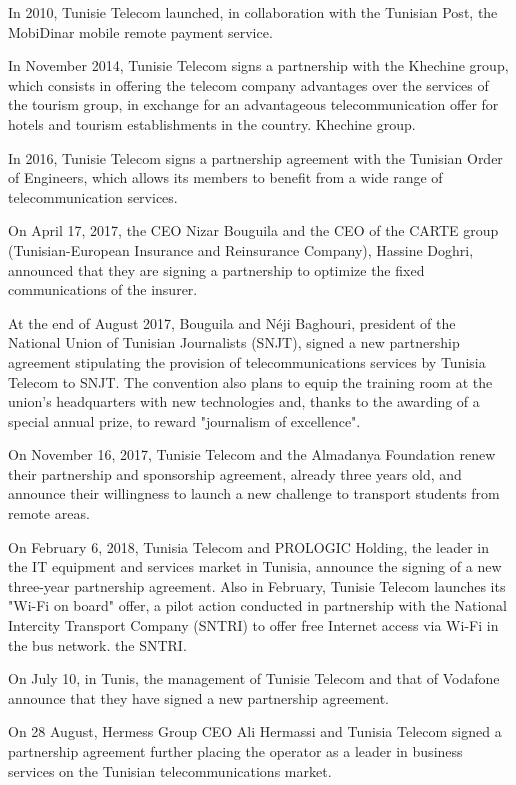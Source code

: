 In 2010, Tunisie Telecom launched, in collaboration with the Tunisian Post, the MobiDinar mobile remote payment service.

In November 2014, Tunisie Telecom signs a partnership with the Khechine group, which consists in offering the telecom company advantages over the services of the tourism group, in exchange for an advantageous telecommunication offer for hotels and tourism establishments in the country. Khechine group.

In 2016, Tunisie Telecom signs a partnership agreement with the Tunisian Order of Engineers, which allows its members to benefit from a wide range of telecommunication services.

On April 17, 2017, the CEO Nizar Bouguila and the CEO of the CARTE group (Tunisian-European Insurance and Reinsurance Company), Hassine Doghri, announced that they are signing a partnership to optimize the fixed communications of the insurer.

At the end of August 2017, Bouguila and Néji Baghouri, president of the National Union of Tunisian Journalists (SNJT), signed a new partnership agreement stipulating the provision of telecommunications services by Tunisia Telecom to SNJT. 
The convention also plans to equip the training room at the union's headquarters with new technologies and, thanks to the awarding of a special annual prize, to reward "journalism of excellence".

On November 16, 2017, Tunisie Telecom and the Almadanya Foundation renew their partnership and sponsorship agreement, already three years old, and announce their willingness to launch a new challenge to transport students from remote areas.

On February 6, 2018, Tunisia Telecom and PROLOGIC Holding, the leader in the IT equipment and services market in Tunisia, announce the signing of a new three-year partnership agreement. Also in February, Tunisie Telecom launches its "Wi-Fi on board" offer, a pilot action conducted in partnership with the National Intercity Transport Company (SNTRI) to offer free Internet access via Wi-Fi in the bus network. the SNTRI.

On July 10, in Tunis, the management of Tunisie Telecom and that of Vodafone announce that they have signed a new partnership agreement.

On 28 August, Hermess Group CEO Ali Hermassi and Tunisia Telecom signed a partnership agreement further placing the operator as a leader in business services on the Tunisian telecommunications market.

